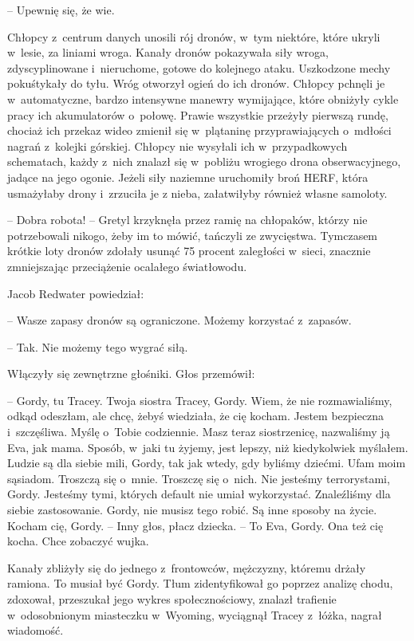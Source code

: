 \documentclass[oneside,polish,11pt,sfheadings]{mwbk}
\begin{document}
-- Upewnię się, że wie.

Chłopcy z~centrum danych unosili rój dronów, w~tym niektóre, które
ukryli w~lesie, za liniami wroga. Kanały dronów pokazywała siły wroga,
zdyscyplinowane i~nieruchome, gotowe do kolejnego ataku. Uszkodzone
mechy pokuśtykały do tyłu. Wróg otworzył ogień do ich dronów. Chłopcy
pchnęli je w~automatyczne, bardzo intensywne manewry wymijające, które
obniżyły cykle pracy ich akumulatorów o~połowę. Prawie wszystkie
przeżyły pierwszą rundę, chociaż ich przekaz wideo zmienił się w~plątaninę przyprawiających o~mdłości nagrań z~kolejki górskiej. Chłopcy
nie wysyłali ich w~przypadkowych schematach, każdy z~nich znalazł się w~pobliżu wrogiego drona obserwacyjnego, jadące na jego ogonie. Jeżeli
siły naziemne uruchomiły broń HERF, która usmażyłaby drony i~zrzuciła je
z nieba, załatwiłyby również własne samoloty.

-- Dobra robota! -- Gretyl krzyknęła przez ramię na chłopaków, którzy nie
potrzebowali nikogo, żeby im to mówić, tańczyli ze zwycięstwa. Tymczasem
krótkie loty dronów zdołały usunąć 75 procent zaległości w~sieci,
znacznie zmniejszając przeciążenie ocalałego światłowodu.

Jacob Redwater powiedział: 

-- Wasze zapasy dronów są ograniczone. Możemy
korzystać z~zapasów.

-- Tak. Nie możemy tego wygrać siłą.

Włączyły się zewnętrzne głośniki. Głos przemówił: 

-- Gordy, tu Tracey.
Twoja siostra Tracey, Gordy. Wiem, że nie rozmawialiśmy, odkąd odeszłam,
ale chcę, żebyś wiedziała, że cię kocham. Jestem bezpieczna i~szczęśliwa. Myślę o~Tobie codziennie. Masz teraz siostrzenicę,
nazwaliśmy ją Eva, jak mama. Sposób, w~jaki tu żyjemy, jest lepszy, niż
kiedykolwiek myślałem. Ludzie są dla siebie mili, Gordy, tak jak wtedy,
gdy byliśmy dziećmi. Ufam moim sąsiadom. Troszczą się o~mnie. Troszczę
się o~nich. Nie jesteśmy terrorystami, Gordy. Jesteśmy tymi, których
default nie umiał wykorzystać. Znaleźliśmy dla siebie zastosowanie.
Gordy, nie musisz tego robić. Są inne sposoby na życie. Kocham cię,
Gordy. -- Inny głos, płacz dziecka. -- To Eva, Gordy. Ona też cię kocha.
Chce zobaczyć wujka.

Kanały zbliżyły się do jednego z~frontowców, mężczyzny, któremu drżały
ramiona. To musiał być Gordy. Tłum zidentyfikował go poprzez analizę
chodu, zdoxował, przeszukał jego wykres społecznościowy, znalazł
trafienie w~odosobnionym miasteczku w~Wyoming, wyciągnął Tracey z~łóżka,
nagrał wiadomość.
\end{document}
